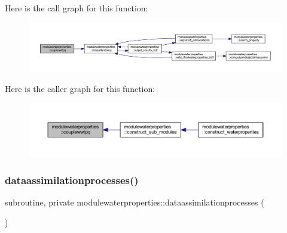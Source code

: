 Here is the call graph for this function\+:\nopagebreak
\begin{figure}[H]
\begin{center}
\leavevmode
\includegraphics[width=350pt]{namespacemodulewaterproperties_a2c86f539e4715abad89dc127b5f17d20_cgraph}
\end{center}
\end{figure}
Here is the caller graph for this function\+:\nopagebreak
\begin{figure}[H]
\begin{center}
\leavevmode
\includegraphics[width=350pt]{namespacemodulewaterproperties_a2c86f539e4715abad89dc127b5f17d20_icgraph}
\end{center}
\end{figure}
\mbox{\label{namespacemodulewaterproperties_abdbc309080b92eb5274f0481166c683d}} 
\subsubsection{\texorpdfstring{dataassimilationprocesses()}{dataassimilationprocesses()}}
{\footnotesize\ttfamily subroutine, private modulewaterproperties\+::dataassimilationprocesses (\begin{DoxyParamCaption}{ }\end{DoxyParamCaption})\hspace{0.3cm}{\ttfamily [private]}}

